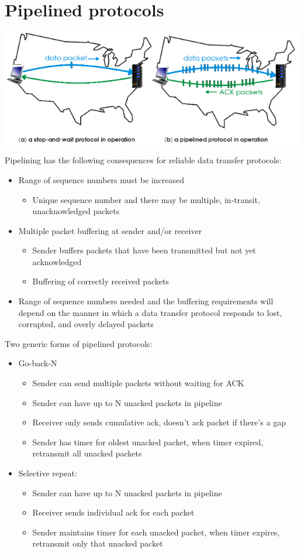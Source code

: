 \documentclass{article}[18pt]
\begin{document}
\section{Pipelined protocols}
\begin{center}
	\includegraphics[scale=0.7]{pipelined_protocols1}
\end{center}
Pipelining has the following consequences for reliable data transfer protocols:
\begin{itemize}
	\item Range of sequence numbers must be increased
	\begin{itemize}
		\item Unique sequence number and there may be multiple, in-transit, unacknowledged packets
	\end{itemize}
	\item Multiple packet buffering at sender and/or receiver
	\begin{itemize}
		\item Sender buffers packets that have been transmitted but not yet acknowledged
		\item Buffering of correctly received packets
	\end{itemize}
	\item Range of sequence numbers needed and the buffering requirements will depend on the manner in which a data transfer protocol responds to lost, corrupted, and overly delayed packets
\end{itemize}
Two generic forms of pipelined protocols:
\begin{itemize}
	\item Go-back-N
	\begin{itemize}
		\item Sender can send multiple packets without waiting for ACK
		\item Sender can have up to N unacked packets in pipeline
		\item Receiver only sends cumulative ack, doesn't ack packet if there's a gap
		\item Sender has timer for oldest unacked packet, when timer expired, retransmit all unacked packets
	\end{itemize}
	\item Selective repeat:
	\begin{itemize}
		\item Sender can have up to N unacked packets in pipeline
		\item Receiver sends individual ack for each packet
		\item Sender maintains timer for each unacked packet, when timer expires, retransmit only that unacked packet
	\end{itemize}
\end{itemize}
\end{document}
